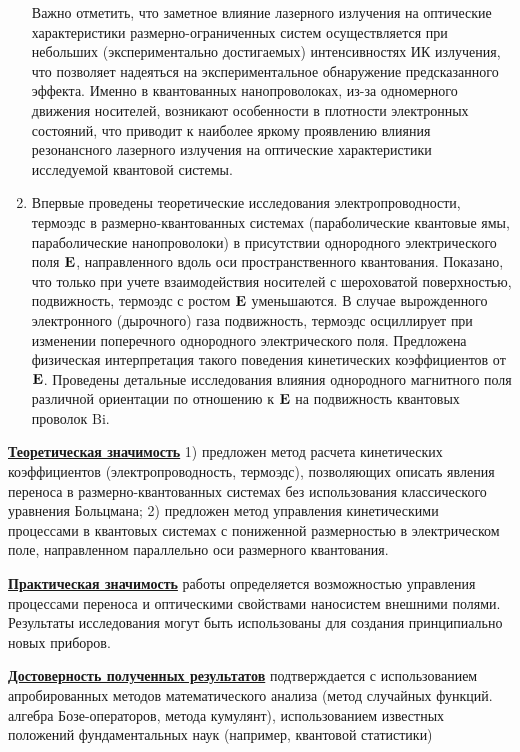 \begin{enumerate}
	Важно отметить, что заметное влияние лазерного излучения на оптические характеристики размерно-ограниченных систем осуществляется при небольших (экспериментально достигаемых) интенсивностях ИК излучения, что позволяет надеяться на экспериментальное обнаружение предсказанного эффекта. Именно в квантованных нанопроволоках, из-за одномерного движения носителей, возникают особенности в плотности электронных состояний, что приводит к наиболее яркому проявлению влияния резонансного лазерного излучения на оптические характеристики исследуемой квантовой системы.
	\item Впервые проведены теоретические исследования электропроводности, термоэдс в размерно-квантованных системах (параболические квантовые ямы, параболические нанопроволоки) в присутствии однородного электрического поля $\boldsymbol{\mathbf{E}}$, направленного вдоль оси пространственного квантования. 
	Показано, что только при учете взаимодействия носителей с шероховатой поверхностью, подвижность, термоэдс с ростом $\boldsymbol{\mathbf{E}}$ уменьшаются. В случае вырожденного электронного (дырочного) газа подвижность, термоэдс осциллирует при изменении поперечного однородного электрического поля. Предложена физическая интерпретация такого поведения кинетических коэффициентов от  $\boldsymbol{\mathbf{E}}$. Проведены детальные исследования влияния однородного магнитного поля различной ориентации по отношению к $\boldsymbol{\mathbf{E}}$ на подвижность квантовых проволок Bi.
\end{enumerate}

\underline{\textbf{Теоретическая значимость}} 1) предложен метод расчета кинетических коэффициентов (электропроводность, термоэдс), позволяющих описать явления переноса в размерно-квантованных системах без использования классического уравнения Больцмана; 2) предложен метод управления кинетическими процессами в квантовых системах с пониженной размерностью в электрическом поле, направленном параллельно оси размерного квантования.

\underline{\textbf{Практическая значимость}} работы определяется возможностью управления процессами переноса и оптическими свойствами наносистем внешними полями. Результаты исследования могут быть использованы для создания принципиально новых приборов.

\underline{\textbf{Достоверность полученных результатов}} подтверждается с использованием апробированных методов математического анализа (метод случайных функций. алгебра Бозе-операторов, метода кумулянт), использованием известных положений фундаментальных наук (например, квантовой статистики)


